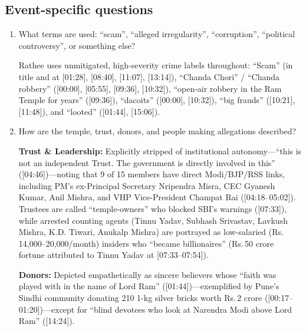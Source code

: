 \documentclass[10pt,a4paper]{article}
\begin{document}
\subsection*{Event-specific questions}
\begin{enumerate}[leftmargin=1.5em, itemsep=6pt, topsep=4pt]
  \item What terms are used: ``scam'', ``alleged irregularity'', ``corruption'', ``political controversy'', or something else?\par\smallskip
  Rathee uses unmitigated, high-severity crime labels throughout: ``Scam'' (in title and at [01:28], [08:40], [11:07], [13:14]), ``Chanda Chori'' / ``Chanda robbery'' ([00:00], [05:55], [09:36], [10:32]), ``open-air robbery in the Ram Temple for years'' ([09:36]), ``dacoits'' ([00:00], [10:32]), ``big frauds'' ([10:21], [11:48]), and ``looted'' ([01:44], [15:06]).
  \item How are the temple, trust, donors, and people making allegations described?\par\smallskip
  \textbf{Trust \& Leadership:} Explicitly stripped of institutional autonomy---``this is not an independent Trust. The government is directly involved in this'' ([04:46])---noting that 9 of 15 members have direct Modi/BJP/RSS links, including PM's ex-Principal Secretary Nripendra Misra, CEC Gyanesh Kumar, Anil Mishra, and VHP Vice-President Champat Rai ([04:18--05:02]). Trustees are called ``temple-owners'' who blocked SBI's warnings ([07:33]), while arrested counting agents (Tinnu Yadav, Subhash Srivastav, Lavkush Mishra, K.D. Tiwari, Anukalp Mishra) are portrayed as low-salaried (Rs.\,14,000--20,000/month) insiders who ``became billionaires'' (Rs.\,50 crore fortune attributed to Tinnu Yadav at [07:33--07:54]).

  \textbf{Donors:} Depicted empathetically as sincere believers whose ``faith was played with in the name of Lord Ram'' ([01:44])---exemplified by Pune's Sindhi community donating 210 1-kg silver bricks worth Rs.\,2 crore ([00:17--01:20])---except for ``blind devotees who look at Narendra Modi above Lord Ram'' ([14:24]).


\end{enumerate}
\end{document}
